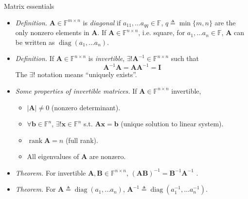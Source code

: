 \documentclass{beamer}
\numberwithin{equation}{section}
\begin{document}
\begin{frame}{Matrix essentials}
    \begin{itemize}
        \item
        \textit{Definition.} $ \mathbf{A} \in \mathbb{F}^{m \times n} $
        is \textit{diagonal} if $ a_{11}, \ldots a_{qq}  \in \mathbb{F} $,
        $ q \triangleq \min\{m, n\} $ are the only nonzero elements in
        $ \mathbf{A} $. If $ \mathbf{A} \in \mathbb{F}^{n \times n} $, i.e.
        square, for $ a_1, \ldots a_n \in \mathbb{F} $, $ \mathbf{A} $ can
        be written as $ \operatorname{diag}(a_1, \ldots a_n) $.
        
        \item
        \textit{Definition.} If $ \mathbf{A} \in \mathbb{F}^{n \times n} $ is
        \textit{invertible}, $ \exists! \mathbf{A}^{-1} \in
        \mathbb{F}^{n \times n} $ such that
        \begin{equation*}
            \mathbf{A}^{-1}\mathbf{A} = \mathbf{AA}^{-1} = \mathbf{I}
        \end{equation*}
        The $ \exists! $ notation means ``uniquely exists''.

        \item
        \textit{
            Some properties of invertible matrices\footnotemark{}.
        } If $ \mathbf{A} \in
        \mathbb{F}^{n \times n} $ invertible,
        \begin{itemize}
            \item
            $ |\mathbf{A}| \ne 0 $ (nonzero determinant).

            \item
            $ \forall \mathbf{b} \in \mathbb{F}^n $, $ \exists! \mathbf{x} \in
            \mathbb{F}^n $ s.t. $ \mathbf{Ax} = \mathbf{b} $ (unique solution
            to linear system).

            \item
            $ \operatorname{rank}\mathbf{A} = n $ (full rank).

            \item
            All eigenvalues of $ \mathbf{A} $ are nonzero.
        \end{itemize}

        \item
        \textit{Theorem.} For invertible $ \mathbf{A}, \mathbf{B} \in
        \mathbb{F}^{n \times n} $, $ (\mathbf{AB})^{-1} =
        \mathbf{B}^{-1}\mathbf{A}^{-1} $ \cite{jacob_linalg}.

        \item
        \textit{Theorem.} For $ \mathbf{A} \triangleq
        \operatorname{diag}(a_1, \ldots a_n) $, $ \mathbf{A}^{-1} \triangleq
        \operatorname{diag}\left(a_1^{-1}, \ldots a_n^{-1}\right) $.
    \end{itemize}

    \medskip
\end{frame}
\end{document}
